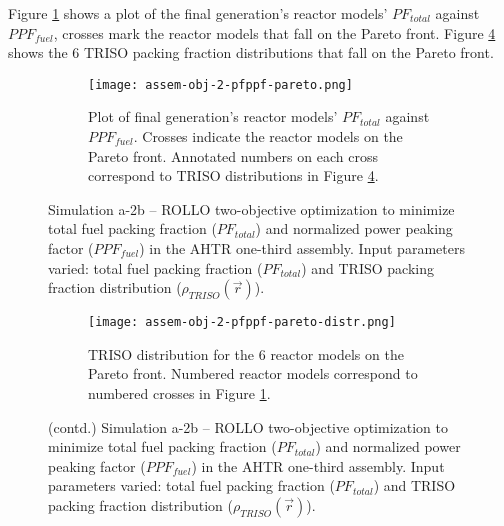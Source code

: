 Figure \ref{fig:assem-obj-2-pfppf-pareto} shows a plot of the final generation's reactor 
models' $PF_{total}$ against $PPF_{fuel}$, crosses mark the reactor models that fall on 
the Pareto front.
Figure \ref{fig:assem-obj-2-pfppf-pareto-distr} shows the 6 TRISO packing fraction 
distributions that fall on the Pareto front. 
\begin{figure}[htbp!]
    \begin{subfigure}{\textwidth}
        \centering
        \texttt{[image: assem-obj-2-pfppf-pareto.png]}
        \caption{Plot of final generation's reactor models' $PF_{total}$ against 
        $PPF_{fuel}$. 
        Crosses indicate the reactor models on the Pareto front. Annotated numbers 
        on each cross correspond to TRISO distributions in Figure 
        \ref{fig:assem-obj-2-pfppf-pareto-distr}.}
        \label{fig:assem-obj-2-pfppf-pareto} 
    \end{subfigure}
    \caption{Simulation a-2b -- ROLLO two-objective optimization to minimize total fuel 
    packing fraction ($PF_{total}$) and normalized power peaking factor ($PPF_{fuel}$) 
    in the \gls{AHTR} one-third assembly. 
    Input parameters varied: total fuel packing fraction ($PF_{total}$) and TRISO 
    packing fraction distribution ($\rho_{TRISO}(\vec{r})$).}
    \label{fig:assem-obj-2-pfppf}
\end{figure}
\begin{figure}[htbp!]
    \ContinuedFloat
    \begin{subfigure}{\textwidth}
        \centering
        \texttt{[image: assem-obj-2-pfppf-pareto-distr.png]}
        \caption{TRISO distribution for the 6 reactor models on the Pareto front.
        Numbered reactor models correspond to numbered crosses in Figure 
        \ref{fig:assem-obj-2-pfppf-pareto}. }
        \label{fig:assem-obj-2-pfppf-pareto-distr} 
    \end{subfigure}
    \caption{(contd.) Simulation a-2b -- ROLLO two-objective optimization to minimize total fuel 
    packing fraction ($PF_{total}$) and normalized power peaking factor ($PPF_{fuel}$) 
    in the \gls{AHTR} one-third assembly. 
    Input parameters varied: total fuel packing fraction ($PF_{total}$) and TRISO 
    packing fraction distribution ($\rho_{TRISO}(\vec{r})$).}
\end{figure}

